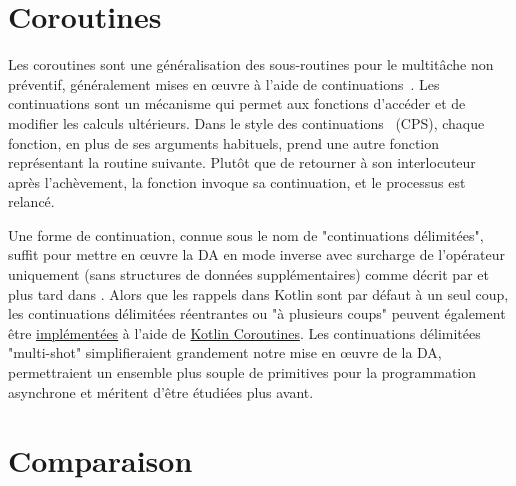 \section{Coroutines}\label{sec:coroutines}

Les coroutines sont une généralisation des sous-routines pour le multitâche non préventif, généralement mises en œuvre à l'aide de continuations~\citep{haynes1984continuations}. Les continuations sont un mécanisme qui permet aux fonctions d'accéder et de modifier les calculs ultérieurs. Dans le style des continuations~\citep{sussman1975scheme} (CPS), chaque fonction, en plus de ses arguments habituels, prend une autre fonction représentant la routine suivante. Plutôt que de retourner à son interlocuteur après l'achèvement, la fonction invoque sa continuation, et le processus est relancé.

Une forme de continuation, connue sous le nom de "continuations délimitées", suffit pour mettre en œuvre la DA en mode inverse avec surcharge de l'opérateur uniquement (sans structures de données supplémentaires) comme décrit par \citet{wang2018demystifying} et plus tard dans \citet{wang2018backpropagation}. Alors que les rappels dans Kotlin sont par défaut à un seul coup, les continuations délimitées réentrantes ou "à plusieurs coups" peuvent également être \href{https://gist.github.com/elizarov/ddee47f927dda500dc493e945128d661}{implémentées} à l'aide de \href{https://kotlinlang.org/docs/reference/coroutines-overview.html}{Kotlin Coroutines}. Les continuations délimitées "multi-shot" simplifieraient grandement notre mise en œuvre de la DA, permettraient un ensemble plus souple de primitives pour la programmation asynchrone et méritent d'être étudiées plus avant.

\section{Comparaison}\label{sec:comparison}

